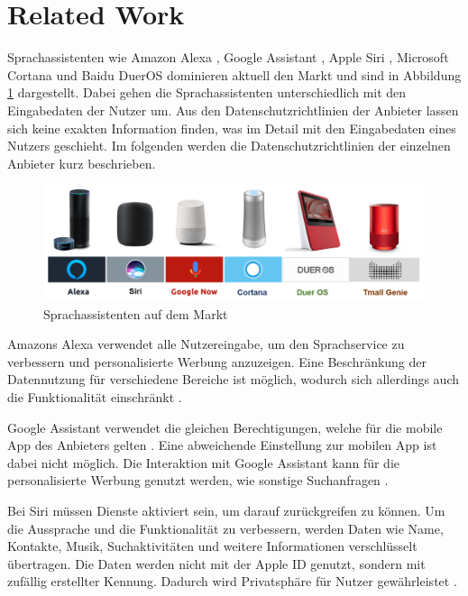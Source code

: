 \section{Related Work}
Sprachassistenten wie Amazon Alexa \cite{alexaAssitent}, Google Assistant \cite{googleAssistant}, Apple Siri \cite{siriAssistent}, Microsoft Cortana \cite{cortanaAssistent} und Baidu DuerOS \cite{baiduAssistant} dominieren aktuell den Markt und sind in Abbildung \ref{fig:sprachassistenten} dargestellt. Dabei gehen die Sprachassistenten unterschiedlich mit den Eingabedaten der Nutzer um. Aus den Datenschutzrichtlinien der Anbieter lassen sich keine exakten Information finden, was im Detail mit den Eingabedaten eines Nutzers geschieht. Im folgenden werden die Datenschutzrichtlinien der einzelnen Anbieter kurz beschrieben.

\begin{figure}[h!]
	\centering
	\includegraphics[width=1\linewidth]{Picture/Sprachassistenten}
	\caption[Sprachassistenten auf dem Markt]{Sprachassistenten auf dem Markt}
	\label{fig:sprachassistenten}
\end{figure}

Amazons Alexa verwendet alle Nutzereingabe, um den Sprachservice zu verbessern und personalisierte Werbung anzuzeigen. Eine Beschränkung der Datennutzung für verschiedene Bereiche ist möglich, wodurch sich allerdings auch die Funktionalität einschränkt \cite{alexaPrivacy}.

Google Assistant verwendet die gleichen Berechtigungen, welche für die mobile App des Anbieters gelten \cite{googleShare}. Eine abweichende Einstellung zur mobilen App ist dabei nicht möglich. Die Interaktion mit Google Assistant kann für die personalisierte Werbung genutzt werden, wie sonstige Suchanfragen \cite{googlePrivacy}.

Bei Siri müssen Dienste aktiviert sein, um darauf zurückgreifen zu können. Um die Aussprache und die Funktionalität zu verbessern, werden Daten wie Name, Kontakte, Musik, Suchaktivitäten und weitere Informationen verschlüsselt übertragen. Die Daten werden nicht mit der Apple ID genutzt, sondern mit zufällig erstellter Kennung. Dadurch wird Privatsphäre für Nutzer gewährleistet \cite{siriPrivacy}.

